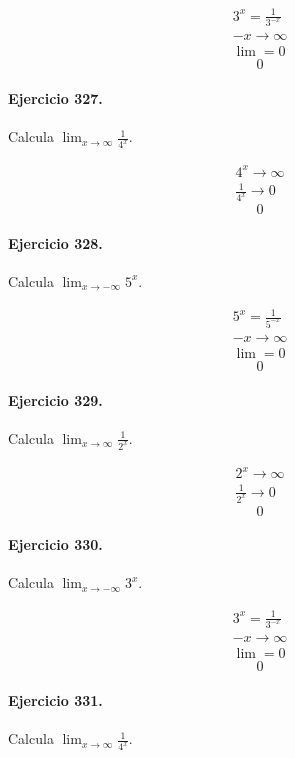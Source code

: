 \documentclass[11pt,a4paper]{article}
\begin{document}
\[
\begin{aligned}
3^x=\frac{1}{3^{-x}}\\
-x\to\infty\\
\lim=0
\end{aligned}
\]
\[\boxed{0}\]


\paragraph{Ejercicio 327.} Calcula $\displaystyle\lim_{x\to\infty}\frac{1}{4^x}$.

\[
\begin{aligned}
4^x\to\infty\\
\frac{1}{4^x}\to0
\end{aligned}
\]
\[\boxed{0}\]


\paragraph{Ejercicio 328.} Calcula $\displaystyle\lim_{x\to-\infty}5^x$.

\[
\begin{aligned}
5^x=\frac{1}{5^{-x}}\\
-x\to\infty\\
\lim=0
\end{aligned}
\]
\[\boxed{0}\]


\paragraph{Ejercicio 329.} Calcula $\displaystyle\lim_{x\to\infty}\frac{1}{2^x}$.

\[
\begin{aligned}
2^x\to\infty\\
\frac{1}{2^x}\to0
\end{aligned}
\]
\[\boxed{0}\]


\paragraph{Ejercicio 330.} Calcula $\displaystyle\lim_{x\to-\infty}3^x$.

\[
\begin{aligned}
3^x=\frac{1}{3^{-x}}\\
-x\to\infty\\
\lim=0
\end{aligned}
\]
\[\boxed{0}\]


\paragraph{Ejercicio 331.} Calcula $\displaystyle\lim_{x\to\infty}\frac{1}{4^x}$.
\end{document}
